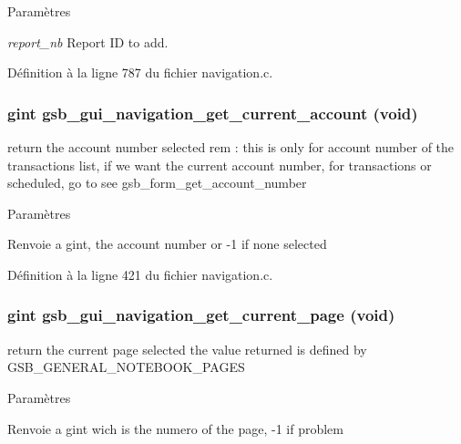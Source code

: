 \begin{DoxyParams}{Paramètres}
\item[{\em report\_\-nb}]Report ID to add. \end{DoxyParams}


Définition à la ligne 787 du fichier navigation.c.

\subsubsection[{gsb\_\-gui\_\-navigation\_\-get\_\-current\_\-account}]{\setlength{\rightskip}{0pt plus 5cm}gint gsb\_\-gui\_\-navigation\_\-get\_\-current\_\-account (void)}\label{navigation_8c_a3b668bf52ce71dcff3ea10c9db7be859}
return the account number selected rem : this is only for account number of the transactions list, if we want the current account number, for transactions or scheduled, go to see gsb\_\-form\_\-get\_\-account\_\-number


\begin{DoxyParams}{Paramètres}
\item[{\em }]\end{DoxyParams}
\begin{DoxyReturn}{Renvoie}
a gint, the account number or -\/1 if none selected 
\end{DoxyReturn}


Définition à la ligne 421 du fichier navigation.c.

\subsubsection[{gsb\_\-gui\_\-navigation\_\-get\_\-current\_\-page}]{\setlength{\rightskip}{0pt plus 5cm}gint gsb\_\-gui\_\-navigation\_\-get\_\-current\_\-page (void)}\label{navigation_8c_a06fa2882a164439e56e780c2127cd22c}
return the current page selected the value returned is defined by GSB\_\-GENERAL\_\-NOTEBOOK\_\-PAGES


\begin{DoxyParams}{Paramètres}
\item[{\em }]\end{DoxyParams}
\begin{DoxyReturn}{Renvoie}
a gint wich is the numero of the page, -\/1 if problem 
\end{DoxyReturn}


